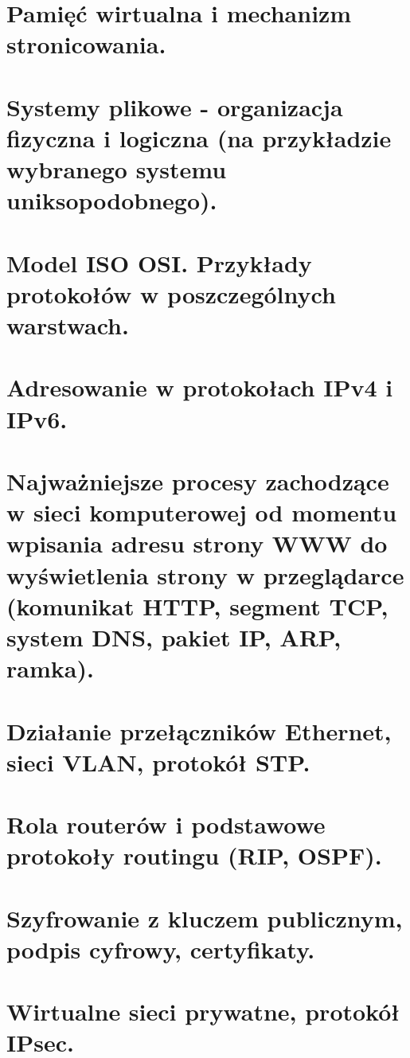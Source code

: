 \documentclass[12pt]{article}
\begin{document}
    \section{Pamięć wirtualna i mechanizm stronicowania.}
    \section{Systemy plikowe - organizacja fizyczna i logiczna (na przykładzie wybranego systemu uniksopodobnego).}
    \section{Model ISO OSI. Przykłady protokołów w poszczególnych warstwach.}
    \section{Adresowanie w protokołach IPv4 i IPv6.}
    \section{Najważniejsze procesy zachodzące w sieci komputerowej od momentu wpisania adresu strony WWW do wyświetlenia strony w przeglądarce (komunikat HTTP, segment TCP, system DNS, pakiet IP, ARP, ramka).}
    \section{Działanie przełączników Ethernet, sieci VLAN, protokół STP.}
    \section{Rola routerów i podstawowe protokoły routingu (RIP, OSPF).}
    \section{Szyfrowanie z kluczem publicznym, podpis cyfrowy, certyfikaty.}
    \section{Wirtualne sieci prywatne, protokół IPsec.}
\end{document}
